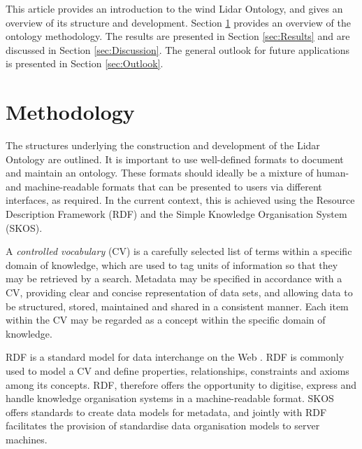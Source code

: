 \documentclass[remotesensing,article,submit,pdftex,moreauthors]{Definitions/mdpi}
\begin{document}
This article provides an introduction to the wind Lidar Ontology, and gives an overview of its structure and development. Section \ref{sec:Methodology} provides an overview of the ontology methodology. The results are presented in Section \ref{sec:Results} and are discussed in Section \ref{sec:Discussion}. The general outlook for future applications is presented in Section \ref{sec:Outlook}.


\section{Methodology}
\label{sec:Methodology}
The structures underlying the construction and development of the Lidar Ontology are outlined.
It is important to use well-defined formats to document and maintain an ontology. These formats should ideally be a mixture of human- and machine-readable formats that can be presented to users via different interfaces, as required. In the current context, this is achieved using the Resource Description Framework (RDF) and the Simple Knowledge Organisation System (SKOS).

A {\it controlled vocabulary} (CV) is a carefully selected list of terms within a specific domain of knowledge, which are used to tag units of information so that they may be retrieved by a search.
Metadata may be specified in accordance with a CV, providing clear and concise representation of data sets, and allowing data to be structured, stored, maintained and shared in a consistent manner. 
Each item within the CV may be regarded as a concept within the specific domain of knowledge.



RDF is a standard model for data interchange on the Web \cite{ref-W3C-RDF}.
RDF is commonly used to model a CV and define properties, relationships, constraints and axioms among its concepts.
RDF, therefore offers the opportunity to digitise, express and handle knowledge organisation systems in a machine-readable format.
SKOS \cite{ref-W3C-SKOS} offers standards to create data models for metadata, and jointly with RDF facilitates the provision of standardise data organisation models to server machines.
\end{document}
